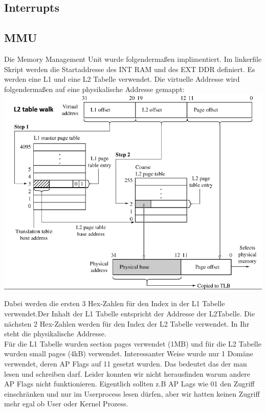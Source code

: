 \documentclass[10pt,a4paper]{article}
\begin{document}
\subsection{Interrupts}
\newpage
\subsection{MMU}
Die Memory Management Unit wurde folgendermaßen implimentiert. 
Im linkerfile Skript werden die Startaddresse des INT RAM und des EXT DDR definiert. Es werden eine L1 und eine L2 Tabelle verwendet. Die virtuelle Addresse wird folgendermaßen auf eine physikalische Addresse gemappt:\\
\includegraphics[scale=0.5]{VirtuellerSpeicher.png} 

Dabei werden die ersten 3 Hex-Zahlen für den Index in der L1 Tabelle verwendet.Der Inhalt der L1 Tabelle entspricht der Addresse der L2Tabelle. Die nächsten 2 Hex-Zahlen werden für den Index der L2 Tabelle verwendet. In Ihr steht die physikalische Addresse.\\
Für die L1 Tabelle wurden section pages verwendet (1MB) und für die L2 Tabelle wurden small pages (4kB) verwendet.
Interessanter Weise wurde nur 1 Domäne verwendet, deren AP Flags auf 11 gesetzt wurden. Das bedeutet das der man lesen und schreiben darf. Leider konnten wir nicht herausfinden warum andere AP Flags nicht funktionieren. Eigentlich sollten z.B AP Lags wie 01 den Zugriff einschränken und nur im Userprocess lesen dürfen, aber wir hatten keinen Zugriff mehr egal ob User oder Kernel Prozess.\\
\end{document}
